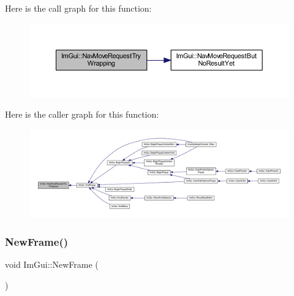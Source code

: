 Here is the call graph for this function\+:
\nopagebreak
\begin{figure}[H]
\begin{center}
\leavevmode
\includegraphics[width=350pt]{namespace_im_gui_a95a9a1a5411cccb918fc29a0b0d3f953_cgraph}
\end{center}
\end{figure}
Here is the caller graph for this function\+:
\nopagebreak
\begin{figure}[H]
\begin{center}
\leavevmode
\includegraphics[width=350pt]{namespace_im_gui_a95a9a1a5411cccb918fc29a0b0d3f953_icgraph}
\end{center}
\end{figure}
\mbox{\label{namespace_im_gui_ab3f1fc018f903b7ad79fd10663375774}} 
\subsubsection{\texorpdfstring{New\+Frame()}{NewFrame()}}
{\footnotesize\ttfamily void Im\+Gui\+::\+New\+Frame (\begin{DoxyParamCaption}{ }\end{DoxyParamCaption})}

